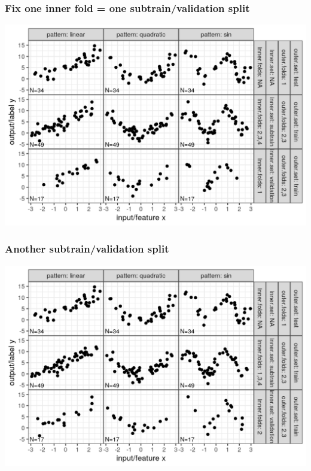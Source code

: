 \documentclass{beamer}
\begin{document}
\begin{frame}
  \frametitle{Fix one inner fold = one subtrain/validation split}

  \includegraphics[width=\textwidth]{figure-overfitting-cv-data-inner-folds-1-1.png}  
\end{frame}

\begin{frame}
  \frametitle{Another subtrain/validation split}

  \includegraphics[width=\textwidth]{figure-overfitting-cv-data-inner-folds-1-2.png}
\end{frame}
\end{document}
